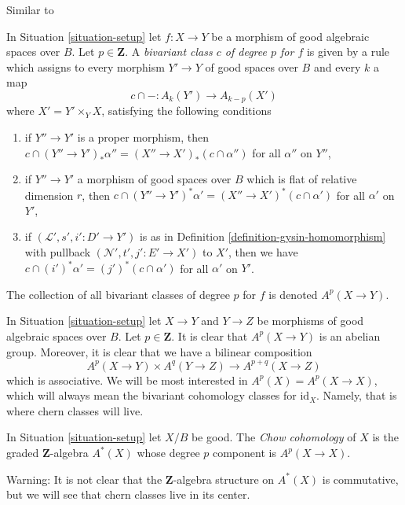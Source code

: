 \begin{definition}
\label{definition-bivariant-class}
\begin{reference}
Similar to \cite[Definition 17.1]{F}
\end{reference}
In Situation \ref{situation-setup} let $f : X \to Y$ be a morphism of
good algebraic spaces over $B$. Let $p \in \mathbf{Z}$.
A {\it bivariant class $c$ of degree $p$ for $f$} is given by a rule
which assigns to every morphism $Y' \to Y$ of good spaces over $B$
and every $k$ a map
$$
c \cap - : A_k(Y') \longrightarrow A_{k - p}(X')
$$
where $X' = Y' \times_Y X$, satisfying the following conditions
\begin{enumerate}
\item if $Y'' \to Y'$ is a proper morphism, then
$c \cap (Y'' \to Y')_*\alpha'' = (X'' \to X')_*(c \cap \alpha'')$
for all $\alpha''$ on $Y''$,
\item if $Y'' \to Y'$ a morphism of good spaces over $B$
which is flat of relative dimension $r$, then
$c \cap (Y'' \to Y')^*\alpha' = (X'' \to X')^*(c \cap \alpha')$
for all $\alpha'$ on $Y'$,
\item if $(\mathcal{L}', s', i' : D' \to Y')$ is as in
Definition \ref{definition-gysin-homomorphism}
with pullback $(\mathcal{N}', t', j' : E' \to X')$ to $X'$,
then we have $c \cap (i')^*\alpha' = (j')^*(c \cap \alpha')$
for all $\alpha'$ on $Y'$.
\end{enumerate}
The collection of all bivariant classes of degree $p$ for $f$ is
denoted $A^p(X \to Y)$.
\end{definition}

\noindent
In Situation \ref{situation-setup} let $X \to Y$ and $Y \to Z$
be morphisms of good algebraic spaces over $B$. Let $p \in \mathbf{Z}$.
It is clear that $A^p(X \to Y)$ is an abelian group.
Moreover, it is clear that we have a bilinear composition
$$
A^p(X \to Y) \times A^q(Y \to Z) \to A^{p + q}(X \to Z)
$$
which is associative.
We will be most interested in $A^p(X) = A^p(X \to X)$, which will always mean
the bivariant cohomology classes for $\text{id}_X$. Namely, that is where
chern classes will live.

\begin{definition}
\label{definition-chow-cohomology}
In Situation \ref{situation-setup} let $X/B$ be good. The {\it Chow cohomology}
of $X$ is the graded $\mathbf{Z}$-algebra $A^*(X)$ whose degree
$p$ component is $A^p(X \to X)$.
\end{definition}

\noindent
Warning: It is not clear that the $\mathbf{Z}$-algebra structure
on $A^*(X)$ is commutative, but we will see that chern classes live
in its center.

